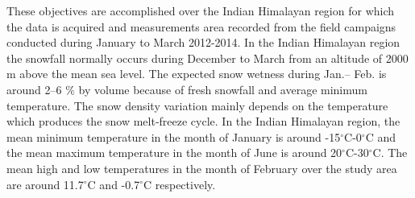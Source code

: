 These objectives are accomplished over the Indian Himalayan region for which the data is acquired and measurements area recorded from the field campaigns conducted during January to March 2012-2014. In the Indian Himalayan region the snowfall normally occurs during December to March from an altitude of 2000 m above the mean sea level. The expected snow wetness during Jan.-- Feb. is around 2--6 $\%$ by volume because of fresh snowfall and average minimum temperature. The snow density variation mainly depends on the temperature which produces the snow melt-freeze cycle. In the Indian Himalayan region, the mean minimum temperature in the month of January is around -15$^\circ$C-0$^\circ$C and the mean maximum temperature in the month of June is around 20$^\circ$C-30$^\circ$C. The mean high and low temperatures in the month of February over the study area are around 11.7$^\circ$C  and -0.7$^\circ$C respectively.
	  
